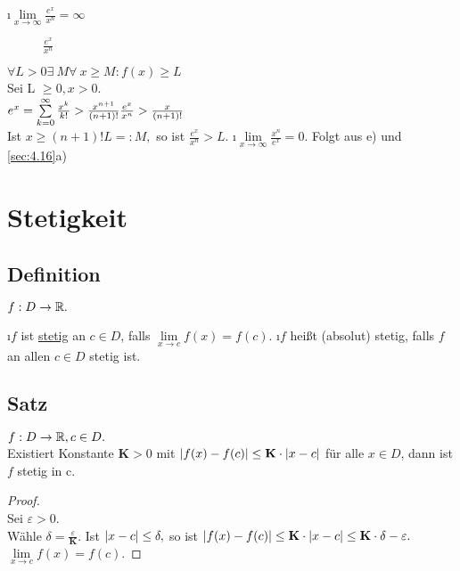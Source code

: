 \begin{enumerate}[a)]
\i $\lim\limits_{x \rightarrow \infty} \frac{e^x}{x^n} = \infty$
\begin{figure}[h!tbp]
\centering
{}
\caption{$\frac{e^x}{x^n}$}
\end{figure}
$\forall L > 0 \exists\ M \forall\ x \ge M : f(x) \ge L$\\
Sei L $ \geq 0, x > 0$. \\
$e^x = \sum\limits_{k =0}^{\infty} \frac{x^k}{k!} > \frac{x^{n+1}}{(n+1)!}\\
\frac{e^x}{x^n} > \frac{x}{(n+1)!}$\\
Ist $x \geq (n+1)! L =: M,$ so ist $\frac{e^x}{x^n} > L$.
\i $\lim\limits_{x \rightarrow \infty} \frac{x^n}{e^x} = 0$.
Folgt aus e) und \ref{sec:4.16}a)
\end{enumerate}
\section{Stetigkeit}
\subsection{Definition}
$f : D \rightarrow \mathbb{R}.$
\begin{enumerate}[a)]
\i $f$ ist \uline{stetig} an $c \in D$, falls $\lim\limits_{x \rightarrow c} f(x) = f(c)$.
\i $f$ hei\ss t (absolut) stetig, falls $f$ an allen $c \in D$ stetig ist.
\end{enumerate}
\subsection{Satz}\label{sec:5.2}
$f: D \rightarrow \mathbb{R} , c \in D.$\\
Existiert Konstante $\mathbf{K} > 0$ mit $\lvert f(x) - f(c) \rvert \leq \mathbf{K} \cdot \lvert x-c \rvert$ für alle $x \in D$, dann ist $f$ stetig in c.
\begin{proof}\ 
\\ Sei $\varepsilon > 0$.\\
Wähle $\delta = \frac{\varepsilon}{\mathbf{K}}$. Ist $\lvert x-c \rvert \leq \delta,$ so ist $\lvert f(x) - f(c) \rvert \leq \mathbf{K} \cdot \lvert x-c \rvert \leq \mathbf{K} \cdot \delta -\varepsilon.\\
$\reversemarginpar{4.7} $\lim\limits_{x \rightarrow c} f(x) = f(c).$
\end{proof}
